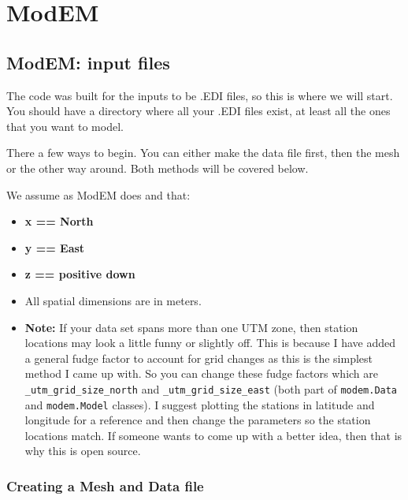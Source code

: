 \section{ModEM}
\label{sec:modeling.modem}

\subsection{ModEM: input files}
\label{sec:modeling.modem.input_files}

The code was built for the inputs to be .EDI files, so this is where we will start.  You should have a directory where all your .EDI files exist, at least all the ones that you want to model.  

There a few ways to begin.  You can either make the data file first, then the mesh or the other way around.  Both methods will be covered below.

We assume as ModEM does and that:

\begin{itemize}
	\item{\bf{x} == North}
	\item{\bf{y} == East}
	\item{\bf{z} == positive down}
	\item{All spatial dimensions are in meters.}
\end{itemize}

\begin{itemize}
\item{{\bf Note:} If your data set spans more than one UTM zone, then station locations may look a little funny or slightly off.  This is because I have added a general fudge factor to account for grid changes as this is the simplest method I came up with.  So you can change these fudge factors which are \verb|_utm_grid_size_north| and \verb|_utm_grid_size_east| (both part of \verb|modem.Data| and \verb|modem.Model| classes).  I suggest plotting the stations in latitude and longitude for a reference and then change the parameters so the station locations match.  If someone wants to come up with a better idea, then that is why this is open source. }
\end{itemize}



\subsubsection{Creating a Mesh and Data file}
\label{sec:modeling.modem.mesh}

